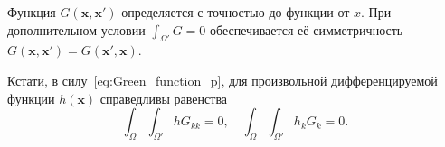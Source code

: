\documentclass{article}
\newcommand{\bx}{\boldsymbol{x}}
\begin{document}
Функция \(G(\bx, \bx')\) определяется с точностью до функции от \(x\).
При дополнительном условии \(\int_{\Omega'} G = 0\)
обеспечивается её симметричность \(G(\bx, \bx') = G(\bx', \bx)\).

Кстати, в силу~\eqref{eq:Green_function_p}, для произвольной дифференцируемой функции \(h(\bx)\) справедливы равенства
\begin{equation}\label{eq:Green_double_integral}
    \int_\Omega \int_{\Omega'} h G_{kk} = 0, \quad
    \int_\Omega \int_{\Omega'} h_k G_k = 0.
\end{equation}
\end{document}
